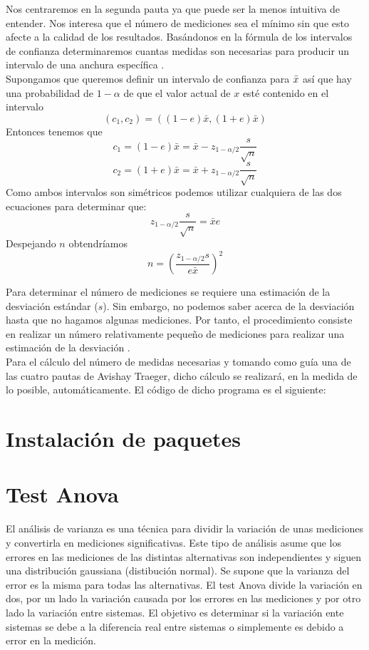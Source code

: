 Nos centraremos en la segunda pauta ya que puede ser la menos intuitiva de entender. Nos interesa que el número de mediciones sea el mínimo sin que esto afecte a la calidad de los resultados. Basándonos en la fórmula de los intervalos de confianza determinaremos cuantas medidas son necesarias para producir un intervalo de una anchura específica \cite{lilja_2000}. \\

Supongamos que queremos definir un intervalo de confianza para $\Bar{x}$ así que hay una probabilidad de $1-\alpha$ de que el valor actual de $x$ esté contenido en el intervalo  $$
\left(c_{1}, c_{2}\right)=((1-e) \bar{x},(1+e) \bar{x})
$$ 
Entonces tenemos que 
$$
c_{1}=(1-e) \bar{x}=\bar{x}-z_{1-\alpha / 2} \frac{s}{\sqrt{n}}
$$
$$
c_{2}=(1+e) \bar{x}=\bar{x}+z_{1-\alpha / 2} \frac{s}{\sqrt{n}}
$$
Como ambos intervalos son simétricos podemos utilizar cualquiera de las dos ecuaciones para determinar que:
$$
z_{1-\alpha / 2} \frac{s}{\sqrt{n}}=\bar{x} e
$$
Despejando $n$ obtendríamos
$$
n=\left(\frac{z_{1-\alpha / 2} s}{e \bar{x}}\right)^{2}
$$ 

Para determinar el número de mediciones se requiere una estimación de la desviación estándar ($s$). Sin embargo, no podemos saber acerca de la desviación hasta que no hagamos algunas mediciones. Por tanto, el procedimiento consiste en realizar un número relativamente pequeño de mediciones para realizar una estimación de la desviación \cite{lilja_2000}. \\ 

Para el cálculo del número de medidas necesarias y tomando como guía una de las cuatro pautas de Avishay Traeger, dicho cálculo se realizará, en la medida de lo posible, automáticamente. El código de dicho programa es el siguiente:  


\section{Instalación de paquetes}
\section{Test Anova}
El análisis de varianza es una técnica para dividir la variación de unas mediciones y convertirla en mediciones significativas. Este tipo de análisis asume que los errores en las mediciones de las distintas alternativas son independientes y siguen una distribución gaussiana (distibución normal). Se supone que la varianza del error es la misma para todas las alternativas. El test Anova divide la variación en dos, por un lado la variación causada por los errores en las mediciones y por otro lado la variación entre sistemas. El objetivo es determinar si la variación ente sistemas se debe a la diferencia real entre sistemas o simplemente es debido a error en la medición. \cite{lilja_2000} \\

